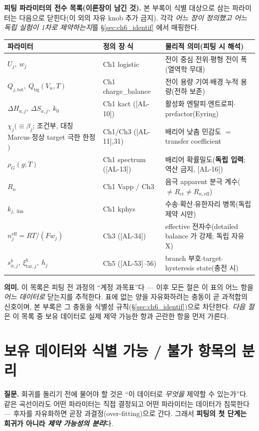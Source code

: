 \documentclass[11pt,a4paper]{article}
\newcommand{\eff}{\mathrm{eff}}
\newcommand{\bg}{\mathrm{bg}}
\newcommand{\tot}{\mathrm{tot}}
\newcommand{\ct}{\mathrm{ct}}
\newcommand{\tar}{\mathrm{tar}}
\newcommand{\AL}[1]{\textsf{[AL-#1]}}
\begin{document}
\textbf{피팅 파라미터의 전수 목록(이론장이 남긴 것).} 본 부록이 식별 대상으로 삼는 파라미터는 다음으로 닫힌다(이 외의
자유 knob 추가 금지). 각각 \emph{어느 장이 정의했고 어느 독립 실험이 1차로 제약하는지}를 \S\ref{sec:ch6_identif}
에서 매핑한다.
\begin{longtable}{p{} p{} p{}}
\toprule 파라미터 & 정의 장$\cdot$식 & 물리적 의미(피팅 시 해석) \\ \midrule \endhead
$U_j,\ w_j$ & Ch1 logistic & 전이 중심 전위$\cdot$평형 전이 폭(열역학 무대) \\
$Q_{j,\tot},\ Q_\bg(V_n,T)$ & Ch1 charge\_balance & 전이 용량 기여$\cdot$배경 누적 용량(전하 보존) \\
$\Delta H_{a,j},\ \Delta S_{a,j},\ k_0$ & Ch1 kact (\AL{10}) & 활성화 엔탈피$\cdot$엔트로피$\cdot$prefactor(Eyring) \\
$\chi_j(\equiv\beta_j$; 조건부, 대칭 Marcus$\cdot$정상 target 극한 한정$)$ & Ch1/Ch3 (\AL{11},31) & 배리어 낮춤 민감도 $=$ transfer coefficient \\
$\rho_G(g;T)$ & Ch1 spectrum (\AL{13}) & 배리어 확률밀도(\textbf{독립 입력}; 역산 금지, \AL{16}) \\
$R_n$ & Ch1 Vapp / Ch3 & 음극 apparent 분극 계수($\ne R_\ct\ne R_{n,\eff}$) \\
$k_{j,\lim}$ & Ch1 kphys & 수송$\cdot$확산$\cdot$유한자리 병목(독립 제약 시만) \\
$n_j^{\eff}=RT/(Fw_j)$ & Ch3 (\AL{34}) & effective 전자수(detailed balance 가 강제; 독립 자유 X) \\
$s_{\phi,j}^b,\ \xi_{\tar,j}^b,\ h_j$ & Ch5 (\AL{53}--56) & branch 부호$\cdot$target$\cdot$hysteresis state(충전 시) \\
\bottomrule
\end{longtable}

\textbf{의미.} 이 목록은 피팅 전 과정의 ``계정 과목표''다 — 이후 모든 절은 이 표의 어느 항을 \emph{어느 데이터로}
닫는지를 추적한다. 표에 없는 양을 자유화하려는 충동이 곧 과적합의 신호이며, 본 부록은 그 충동을 식별성
규칙(\S\ref{sec:ch6_identif})으로 차단한다. \emph{다음 절}은 이 목록 중 보유 데이터로 실제 제약 가능한 항과
곤란한 항을 먼저 가른다.

\section{보유 데이터와 식별 가능 / 불가 항목의 분리}\label{sec:ch6_data}
\textbf{질문.} 회귀를 돌리기 전에 물어야 할 것은 ``이 데이터로 \emph{무엇을} 제약할 수 있는가''다. 같은 곡선이라도
어떤 파라미터는 직접 결정되고 어떤 파라미터는 데이터가 침묵한다 — 후자를 자유화하면 곧장 과결정(over-fitting)으로
간다. 그래서 \textbf{피팅의 첫 단계는 회귀가 아니라 \emph{제약 가능성의 분리}}다.
\end{document}
